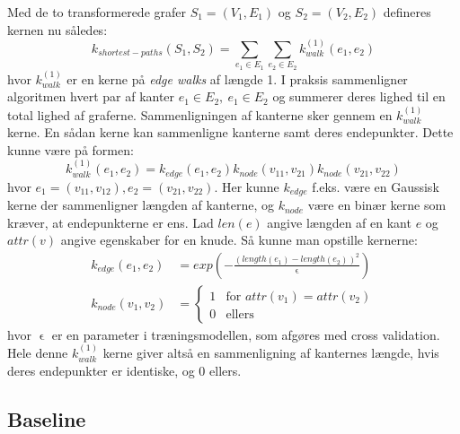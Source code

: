 \documentclass{article}
\def\eps{\mathrel{\epsilon}}
\begin{document}
Med de to transformerede grafer $S_1=(V_1,E_1)$ og $S_2=(V_2,E_2)$ defineres kernen nu således:
\begin{equation}
k_{shortest-paths}(S_1,S_2)=\sum_{e_1\in E_1}\sum_{e_2\in E_2}k^{(1)}_{walk}(e_1,e_2)
\end{equation}
hvor $k^{(1)}_{walk}$ er en kerne på \textit{edge walks} af længde 1. I praksis sammenligner algoritmen hvert par af kanter $e_1\in E_2,\ e_1\in E_2$ og summerer deres lighed til en total lighed af graferne. Sammenligningen af kanterne sker gennem en $k^{(1)}_{walk}$ kerne. En sådan kerne kan sammenligne kanterne samt deres endepunkter. Dette kunne være på formen:
\begin{equation}
k^{(1)}_{walk}(e_1,e_2) = k_{edge}(e_1,e_2)k_{node}(v_{11},v_{21})k_{node}(v_{21},v_{22})
\end{equation}
hvor $e_1=(v_{11},v_{12}),e_2=(v_{21},v_{22})$. Her kunne $k_{edge}$ f.eks. være en Gaussisk kerne der sammenligner længden af kanterne, og $k_{node}$ være en binær kerne som kræver, at endepunkterne er ens. Lad $len(e)$ angive længden af en kant $e$ og $attr(v)$ angive egenskaber for en knude. Så kunne man opstille kernerne:
\begin{align}
k_{edge}(e_1,e_2)&=exp\left(-\frac{(length(e_1)-length(e_2))^2}{\eps}\right)\\
k_{node}(v_1,v_2)&=
\begin{cases}
1 & \text{for }attr(v_1)=attr(v_2)\\
0 & \text{ellers}
\end{cases}
\end{align}
hvor $\eps$ er en parameter i træningsmodellen, som afgøres med cross validation. Hele denne $k_{walk}^{(1)}$ kerne giver altså en sammenligning af kanternes længde, hvis deres endepunkter er identiske, og 0 ellers.

\subsection{Baseline}
\end{document}
